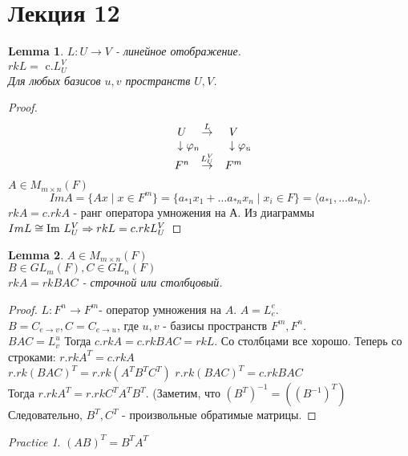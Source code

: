 \documentclass[11pt]{book}
\newcommand{\im}{{\mathop{\text{\rm Im}}}~}
\theoremstyle{definition}
\theoremstyle{plain}
\theoremstyle{plain}
\newtheorem*{lm}{Lemma}
\theoremstyle{definition}
\theoremstyle{remark}
\newtheorem*{prac}{Practice}
\begin{document}
\section{Лекция 12}
\begin{lm}
    $L: U \to V$ - линейное отображение.\\
    $rk L = \mbox{ c.} L_U ^V$ \\
    Для любых базисов $u, v$ пространств $U, V$.
\end{lm}
\begin{proof}
    \[
	\begin{array}{ccc}
	    U & \stackrel{L}\to & V \\
	    \downarrow \lefteqn {\varphi_n} && \downarrow \lefteqn{\varphi_v} \\
	    F^n & \stackrel{L_U ^V} \to & F^m
    \end{array}
    .\] 
    $A \in M_{m \times n} (F)$
    \[
	Im A = \{A x \mid x \in  F^m\} = \{a_{*1} x_1 + \ldots a_{*n}x_n \mid x_i \in  F\} = \langle a_{*1} , \ldots a_{*n} \rangle
    .\] 
    $rk A = c. rk A$ - ранг оператора умножения на А.
    Из диаграммы $Im L \cong \im L_U ^V \Rightarrow rk L = c.rk L_U ^V $
\end{proof}
\begin{lm}
    $A \in M_{m \times n} (F)$\\
    $B \in GL_m(F), C \in GL_n (F)$ \\
    $rk A = rk B A C$ - строчной или столбцовый.
\end{lm}
\begin{proof}
    $L : F^n \to F^m $- оператор умножения на $A$. $A = L_e ^e$.\\
    $B = C_{e \to v}, C = C_{e \to u}$, где $u, v$ - базисы пространств $F^m , F^n$.\\
    $BAC = L_v ^ u$
    Тогда  $c. rk A = c.rk BAC = rk L$.
    Со столбцами все хорошо.
    Теперь со строками:
    $r. rk A^T = c. rk A$ \\
    $r. rk (BAC)^T = r. rk (A^T B^T C^T)$
    $r. rk (BAC)^T = c. rk BAC$ \\
    Тогда $r. rk A^T = r. rk C^T A^T B^T$. (Заметим, что   $(B^T)^{-1} = ((B^{-1})^T)$
    Следовательно, $B^T, C^T$ - произвольные обратимые матрицы.
\end{proof}
\begin{prac}
    $(AB)^T = B^T A^T$
\end{prac}
\end{document}

